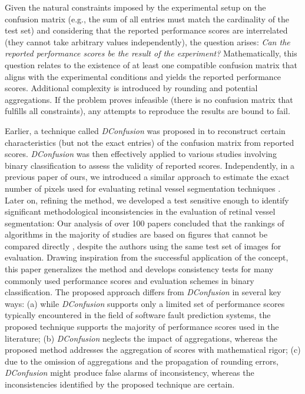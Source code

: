 \documentclass[3p, times]{elsarticle}
\begin{document}
Given the natural constraints imposed by the experimental setup on the confusion matrix (e.g., the sum of all entries must match the cardinality of the test set) and considering that the reported performance scores are interrelated (they cannot take arbitrary values independently), the question arises: \emph{Can the reported performance scores be the result of the experiment?} Mathematically, this question relates to the existence of at least one compatible confusion matrix that aligns with the experimental conditions and yields the reported performance scores. Additional complexity is introduced by rounding and potential aggregations. If the problem proves infeasible (there is no confusion matrix that fulfills all constraints), any attempts to reproduce the results are bound to fail. 

Earlier, a technique called \emph{DConfusion} was proposed in \cite{dconfusion} to reconstruct certain characteristics (but not the exact entries) of the confusion matrix from reported scores. \emph{DConfusion} was then effectively applied to various studies involving binary classification \cite{errorsml} to assess the validity of reported scores.
Independently, in a previous paper of ours, we introduced a similar approach to estimate the exact number of pixels used for evaluating retinal vessel segmentation techniques \cite{vesselsegm}. Later on, refining the method, we developed a test sensitive enough to identify significant methodological inconsistencies in the evaluation of retinal vessel segmentation: Our analysis of over 100 papers concluded that the rankings of algorithms in the majority of studies are based on figures that cannot be compared directly \cite{vessel}, despite the authors using the same test set of images for evaluation. Drawing inspiration from the successful application of the concept, this paper generalizes the method and develops consistency tests for many commonly used performance scores and evaluation schemes in binary classification.
The proposed approach differs from \emph{DConfusion} \cite{dconfusion} in several key ways: (a) while \emph{DConfusion} supports only a limited set of performance scores typically encountered in the field of software fault prediction systems, the proposed technique supports the majority of performance scores used in the literature; (b) \emph{DConfusion} neglects the impact of aggregations, whereas the proposed method addresses the aggregation of scores with mathematical rigor; (c) due to the omission of aggregations and the propagation of rounding errors, \emph{DConfusion} might produce false alarms of inconsistency, whereas the inconsistencies identified by the proposed technique are certain.
\end{document}

